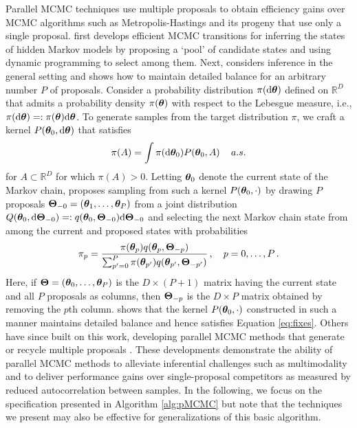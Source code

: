 \documentclass[12pt]{article} %
\begin{document}
Parallel MCMC techniques use multiple proposals to obtain efficiency gains over MCMC algorithms such as Metropolis-Hastings \citep{metropolis1953equation,hastings1970monte} and its progeny that use only a single proposal.  \citet{neal2003markov} first develops efficient MCMC transitions for inferring the states of hidden Markov models by proposing a `pool' of candidate states and using dynamic programming to select among them. Next, \citet{tjelmeland2004using} considers inference in the general setting and shows how to maintain detailed balance for an arbitrary number $P$ of proposals.  Consider a probability distribution $\pi(\mbox{d}\boldsymbol{\theta})$ defined on $\mathbb{R}^D$ that admits a probability density $\pi(\boldsymbol{\theta})$ with respect to the Lebesgue measure, i.e., $\pi(\mbox{d} \boldsymbol{\theta})=:\pi(\boldsymbol{\theta})\mbox{d}\boldsymbol{\theta}$. To generate samples from the target distribution $\pi$, we craft a kernel $P(\boldsymbol{\theta}_0,\mbox{d} \boldsymbol{\theta})$ that satisfies
\begin{align}\label{eq:fixes}
\pi(A) = \int \pi(\mbox{d} \boldsymbol{\theta}_0) P(\boldsymbol{\theta}_0,A) \, \quad a.s.
\end{align} 
for  $A \subset \mathbb{R}^D$ for which $\pi(A) > 0$.  Letting $\boldsymbol{\theta}_0$ denote the current state of the Markov chain, \citet{tjelmeland2004using} proposes sampling from such a kernel $P(\boldsymbol{\theta}_0,\cdot)$ by drawing $P$ proposals $\boldsymbol{\Theta}_{-0}=(\boldsymbol{\theta}_1,\dots,\boldsymbol{\theta}_P)$ from a joint distribution $Q(\boldsymbol{\theta}_0,\mbox{d} \boldsymbol{\Theta}_{-0}) =: q(\boldsymbol{\theta}_0, \boldsymbol{\Theta}_{-0})\mbox{d}  \boldsymbol{\Theta}_{-0}$ and selecting the next Markov chain state from among the current and proposed states with probabilities
\begin{align}\label{eq:probs}
\pi_p = \frac{\pi(\boldsymbol{\theta}_p) q(\boldsymbol{\theta}_p, \boldsymbol{\Theta}_{-p})}{\sum_{p'=0}^P \pi(\boldsymbol{\theta}_{p'})q(\boldsymbol{\theta}_{p'}, \boldsymbol{\Theta}_{-p'})} \, , \quad p=0,\dots,P \, .
\end{align}
Here, if $\boldsymbol{\Theta}=(\boldsymbol{\theta}_0,\dots,\boldsymbol{\theta}_{P})$ is the $D\times (P+1)$ matrix having the current state and all $P$ proposals as columns, then $\boldsymbol{\Theta}_{-p}$ is the $D\times P$ matrix obtained by removing the $p$th column.
\citet{tjelmeland2004using} shows that the kernel $P(\boldsymbol{\theta}_0,\cdot)$ constructed in such a manner maintains detailed balance and hence satisfies Equation \eqref{eq:fixes}.  Others have since built on this work, developing parallel MCMC methods that generate or recycle multiple proposals \citep{frenkel2004speed,delmas2009does,calderhead2014general,yang2018parallelizable,luo2019multiple,schwedes2021rao,holbrook2021generating}.  
These developments demonstrate the ability of parallel MCMC methods to alleviate inferential challenges such as multimodality and to deliver performance gains over single-proposal competitors as measured by reduced autocorrelation between samples.  In the following, we focus on the specification presented in Algorithm \ref{alg:pMCMC} but note that the techniques we present may also be effective for generalizations of this basic algorithm.
\end{document}
